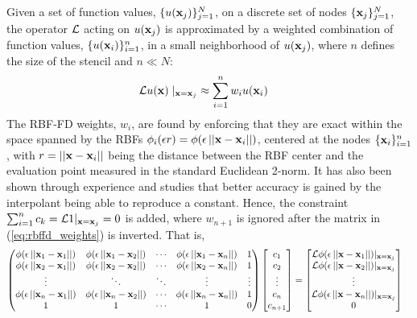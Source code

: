 Given a set of function values, $\{u(\mathbf{x}_j)\}_{j=1}^{N}$, on a discrete set of nodes $\{\mathbf{x}_j\}_{j=1}^{N}$, the operator $\diffop$ acting on $u(\mathbf{x}_j)$ is approximated by a weighted combination of function values, $\{u(\mathbf{x}_i)\}_{i=1}^{n}$, in a small neighborhood of $u(\mathbf{x}_j)$, where $n$ defines the size of the stencil and $n \ll N$:
\begin{align}
\mathcal{L}u(\mathbf{x})\mid_{\mathbf{x}=\mathbf{x}_j} &\approx \sum_{i=1}^{n} w_i u(\mathbf{x}_i)
\label{eq:derivFromFDWeights}
\end{align}
The RBF-FD weights, ${w_i}$, are found by enforcing that they are exact within the space spanned by the RBFs $\phi_i(\epsilon r) = \phi(\epsilon\left|\left|\mathbf{x}-\mathbf{x}_{i}\right|\right|)$, centered at the nodes $\{\mathbf{x}_i\}_{i=1}^{n}$, with $r=\left|\left|\mathbf{x} -\mathbf{x}_i\right|\right|$ being the distance between the RBF center and the evaluation point measured in the standard Euclidean 2-norm. It has also been shown through experience and studies \cite{WrightFornberg06,FornbergDriscoll02,FornbergLehto11,FlyerLehto11} that better accuracy is gained by the interpolant being able to reproduce a constant. Hence, the constraint $\sum_{i=1}^{n}c_k=\mathcal{L}1|_{\mathbf{x}=\mathbf{x}_{j}}=0$ is added, where $w_{n+1}$ is ignored after the matrix in (\ref{eq:rbffd_weights}) is inverted. That is,
\begin{align}
\begin{pmatrix}
\phi(\epsilon\left|\left|\mathbf{x}_1-\mathbf{x}_1\right|\right|) & \phi(\epsilon\left|\left|\mathbf{x}_1-\mathbf{x}_2\right|\right|) & \cdots & \phi(\epsilon\left|\left|\mathbf{x}_1-\mathbf{x}_n\right|\right|) & 1 \\
\phi(\epsilon\left|\left|\mathbf{x}_2-\mathbf{x}_1\right|\right|) & \phi(\epsilon\left|\left|\mathbf{x}_2-\mathbf{x}_2\right|\right|) & \cdots &
\phi(\epsilon\left|\left|\mathbf{x}_2-\mathbf{x}_n\right|\right|) & 1\\
\vdots & \ddots & \ddots & \vdots & \vdots\\
\phi(\epsilon\left|\left|\mathbf{x}_n-\mathbf{x}_1\right|\right|) & \phi(\epsilon\left|\left|\mathbf{x}_n-\mathbf{x}_2\right|\right|) & \cdots &
\phi(\epsilon\left|\left|\mathbf{x}_n-\mathbf{x}_n\right|\right|) & 1 \\
1 & 1 & \cdots & 1 & 0
\end{pmatrix}
\begin{bmatrix} c_1 \\ c_2 \\ \vdots \\ c_n  \\ c_{n+1}\end{bmatrix}
&=
\begin{bmatrix} \mathcal{L}\phi(\epsilon\left|\left|\mathbf{x}-\mathbf{x}_{1}\right|\right|)|_{\mathbf{x}=\mathbf{x}_{j}} \\
               \mathcal{L}\phi(\epsilon\left|\left|\mathbf{x}-\mathbf{x}_{2}\right|\right|)|_{\mathbf{x}=\mathbf{x}_{j}} \\ \vdots \\  \mathcal{L}\phi(\epsilon\left|\left|\mathbf{x}-\mathbf{x}_{n}\right|\right|)|_{\mathbf{x}=\mathbf{x}_{j}}\\
		       0
\end{bmatrix}
\label{eq:rbffd_weights}
\end{align}	
